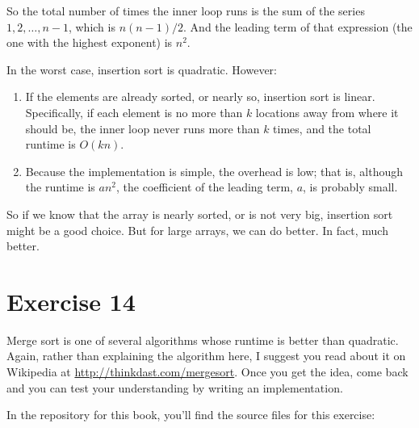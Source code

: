 \documentclass[12pt]{book}
\theoremstyle{exercise}
\newcommand{\java}{\verb}%}
\begin{document}
So the total number of times the inner loop runs is the sum of the
series $1, 2, \ldots , n-1$, which is $n (n-1) / 2$. And the
leading term of that expression (the one with the highest exponent) is
$n^2$.


In the worst case, insertion sort is quadratic. However:

\begin{enumerate}

\item
  If the elements are already sorted, or nearly so, insertion sort is
  linear. Specifically, if each element is no more than $k$
  locations away from where it should be, the inner loop never runs more
  than $k$ times, and the total runtime is $O(kn)$.

\item
  Because the implementation is simple, the overhead is low; that is,
  although the runtime is $a n^2$, the coefficient of the leading
  term, $a$, is probably small.

\end{enumerate}

So if we know that the array is nearly sorted, or is not very big,
insertion sort might be a good choice. But for large arrays, we can
do better. In fact, much better.


\section{Exercise 14}
\label{exercise14}

Merge sort is one of several algorithms whose runtime is better than
quadratic. Again, rather than explaining the algorithm here, I suggest
you read about it on Wikipedia at
\url{http://thinkdast.com/mergesort}.  Once you get the idea, come
back and you can test your understanding by writing an implementation.


In the repository for this book, you'll find the source files for this
exercise:

\end{document}
